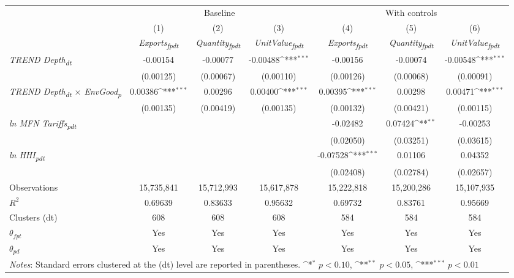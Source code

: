 {
\def\sym#1{\ifmmode^{#1}\else\(^{#1}\)\fi}
\begin{tabular}{l*{6}{c}}
\toprule
&\multicolumn{3}{c}{Baseline}&\multicolumn{3}{c}{With controls}\\\cmidrule(lr){2-4}\cmidrule(lr){5-7}
&(1)&(2)&(3)&(4)&(5)&(6)\\
&\textit{Exports\textsubscript{fpdt}}&\textit{Quantity\textsubscript{fpdt}}&\textit{UnitValue\textsubscript{fpdt}}&\textit{Exports\textsubscript{fpdt}}&\textit{Quantity\textsubscript{fpdt}}&\textit{UnitValue\textsubscript{fpdt}}\\
\midrule
\textit{TREND Depth\textsubscript{dt}} & -0.00154 & -0.00077 & -0.00488\sym{***} & -0.00156 & -0.00074 & -0.00548\sym{***}\\
 & (0.00125) & (0.00067) & (0.00110) & (0.00126) & (0.00068) & (0.00091)\\
\addlinespace
\textit{TREND Depth\textsubscript{dt} $\times$ EnvGood\textsubscript{p}} & 0.00386\sym{***} & 0.00296 & 0.00400\sym{***} & 0.00395\sym{***} & 0.00298 & 0.00471\sym{***}\\
 & (0.00135) & (0.00419) & (0.00135) & (0.00132) & (0.00421) & (0.00115)\\
\addlinespace
\textit{ln MFN Tariffs\textsubscript{pdt}} &  &  &  & -0.02482 & 0.07424\sym{**} & -0.00253\\
 &  &  &  & (0.02050) & (0.03251) & (0.03615)\\
\addlinespace
\textit{ln HHI\textsubscript{pdt}} &  &  &  & -0.07528\sym{***} & 0.01106 & 0.04352\\
 &  &  &  & (0.02408) & (0.02784) & (0.02657)\\
\midrule
Observations & 15,735,841 & 15,712,993 & 15,617,878 & 15,222,818 & 15,200,286 & 15,107,935\\
$R^{2}$ & 0.69639 & 0.83633 & 0.95632 & 0.69732 & 0.83761 & 0.95669\\
Clusters (dt) & 608 & 608 & 608 & 584 & 584 & 584\\
$\theta_{fpt}$ & Yes & Yes & Yes & Yes & Yes & Yes\\
$\theta_{pd}$ & Yes & Yes & Yes & Yes & Yes & Yes\\
\bottomrule
\multicolumn{7}{l}{\footnotesize \textit{Notes}: Standard errors clustered at the (dt) level are reported in parentheses. \sym{*} \(p<0.10\), \sym{**} \(p<0.05\), \sym{***} \(p<0.01\)}\\
\end{tabular}
}

